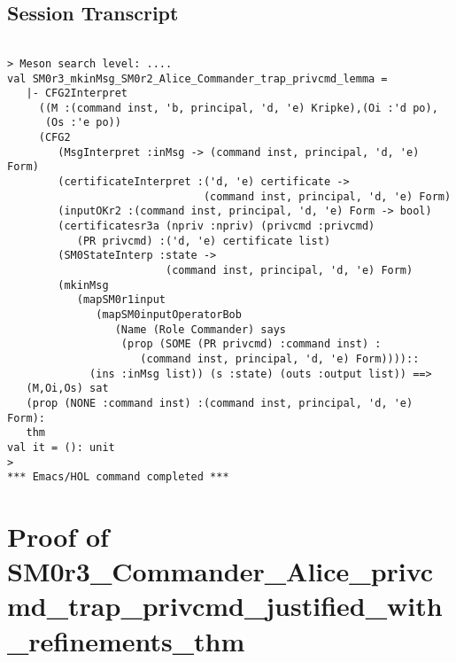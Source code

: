 \documentclass{report}
\begin{document}
\subsection{Session Transcript}
\label{trans5}
\begin{session}
  \begin{scriptsize}
\begin{verbatim}

> Meson search level: ....
val SM0r3_mkinMsg_SM0r2_Alice_Commander_trap_privcmd_lemma =
   |- CFG2Interpret
     ((M :(command inst, 'b, principal, 'd, 'e) Kripke),(Oi :'d po),
      (Os :'e po))
     (CFG2
        (MsgInterpret :inMsg -> (command inst, principal, 'd, 'e) Form)
        (certificateInterpret :('d, 'e) certificate ->
                               (command inst, principal, 'd, 'e) Form)
        (inputOKr2 :(command inst, principal, 'd, 'e) Form -> bool)
        (certificatesr3a (npriv :npriv) (privcmd :privcmd)
           (PR privcmd) :('d, 'e) certificate list)
        (SM0StateInterp :state ->
                         (command inst, principal, 'd, 'e) Form)
        (mkinMsg
           (mapSM0r1input
              (mapSM0inputOperatorBob
                 (Name (Role Commander) says
                  (prop (SOME (PR privcmd) :command inst) :
                     (command inst, principal, 'd, 'e) Form))))::
             (ins :inMsg list)) (s :state) (outs :output list)) ==>
   (M,Oi,Os) sat
   (prop (NONE :command inst) :(command inst, principal, 'd, 'e) Form):
   thm
val it = (): unit
> 
*** Emacs/HOL command completed ***

\end{verbatim}
  \end{scriptsize}
\end{session}


\section{Proof of SM0r3_Commander_Alice_privcmd_trap_privcmd_justified_with_refinements_thm}
\label{proof-6}
\end{document}
